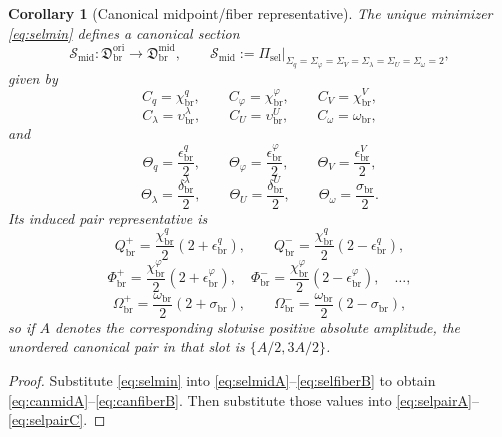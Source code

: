 \documentclass[11pt]{article}
\newcommand{\OriginSector}{\mathfrak D_{\mathrm{br}}^{\mathrm{ori}}}
\newcommand{\AbsReadAmp}{\chi_{\mathrm{br}}^{q}}
\newcommand{\AbsCovAmp}{\chi_{\mathrm{br}}^{\varphi}}
\newcommand{\AbsRelaxAmp}{\chi_{\mathrm{br}}^{V}}
\newcommand{\AbsWellAmp}{\upsilon_{\mathrm{br}}^{\lambda}}
\newcommand{\AbsEqAmp}{\upsilon_{\mathrm{br}}^{U}}
\newcommand{\AbsScaleAmp}{\omega_{\mathrm{br}}}
\newcommand{\PolRead}{\epsilon_{\mathrm{br}}^{q}}
\newcommand{\PolCov}{\epsilon_{\mathrm{br}}^{\varphi}}
\newcommand{\PolRelax}{\epsilon_{\mathrm{br}}^{V}}
\newcommand{\PolWell}{\delta_{\mathrm{br}}^{\lambda}}
\newcommand{\PolEq}{\delta_{\mathrm{br}}^{U}}
\newcommand{\PolScale}{\sigma_{\mathrm{br}}}
\newcommand{\PairReadPlus}{Q_{\mathrm{br}}^{+}}
\newcommand{\PairReadMinus}{Q_{\mathrm{br}}^{-}}
\newcommand{\PairCovPlus}{\Phi_{\mathrm{br}}^{+}}
\newcommand{\PairCovMinus}{\Phi_{\mathrm{br}}^{-}}
\newcommand{\PairScalePlus}{\Omega_{\mathrm{br}}^{+}}
\newcommand{\PairScaleMinus}{\Omega_{\mathrm{br}}^{-}}
\newcommand{\MidFiberSector}{\mathfrak D_{\mathrm{br}}^{\mathrm{mid}}}
\newcommand{\MidRead}{C_{q}}
\newcommand{\MidCov}{C_{\varphi}}
\newcommand{\MidRelax}{C_{V}}
\newcommand{\MidWell}{C_{\lambda}}
\newcommand{\MidEq}{C_{U}}
\newcommand{\MidScale}{C_{\omega}}
\newcommand{\FiberRead}{\Theta_{q}}
\newcommand{\FiberCov}{\Theta_{\varphi}}
\newcommand{\FiberRelax}{\Theta_{V}}
\newcommand{\FiberWell}{\Theta_{\lambda}}
\newcommand{\FiberEq}{\Theta_{U}}
\newcommand{\FiberScale}{\Theta_{\omega}}
\newcommand{\MidSelMap}{\Pi_{\mathrm{sel}}}
\newcommand{\SelRead}{\Sigma_{q}}
\newcommand{\SelCov}{\Sigma_{\varphi}}
\newcommand{\SelRelax}{\Sigma_{V}}
\newcommand{\SelWell}{\Sigma_{\lambda}}
\newcommand{\SelEq}{\Sigma_{U}}
\newcommand{\SelScale}{\Sigma_{\omega}}
\newcommand{\CanMidSection}{\mathscr S_{\mathrm{mid}}}
\newtheorem{corollary}{Corollary}
\begin{document}
\begin{corollary}[Canonical midpoint/fiber representative]
\label{cor:canonicalsection}
The unique minimizer \eqref{eq:selmin} defines a canonical section
\begin{equation}
\CanMidSection:\OriginSector\longrightarrow\MidFiberSector,
\qquad
\CanMidSection:=\MidSelMap\big|_{\SelRead=\SelCov=\SelRelax=\SelWell=\SelEq=\SelScale=2},
\label{eq:cansection}
\end{equation}
given by
\begin{equation}
\MidRead=\AbsReadAmp,
\qquad
\MidCov=\AbsCovAmp,
\qquad
\MidRelax=\AbsRelaxAmp,
\label{eq:canmidA}
\end{equation}
\begin{equation}
\MidWell=\AbsWellAmp,
\qquad
\MidEq=\AbsEqAmp,
\qquad
\MidScale=\AbsScaleAmp,
\label{eq:canmidB}
\end{equation}
and
\begin{equation}
\FiberRead=\frac{\PolRead}{2},
\qquad
\FiberCov=\frac{\PolCov}{2},
\qquad
\FiberRelax=\frac{\PolRelax}{2},
\label{eq:canfiberA}
\end{equation}
\begin{equation}
\FiberWell=\frac{\PolWell}{2},
\qquad
\FiberEq=\frac{\PolEq}{2},
\qquad
\FiberScale=\frac{\PolScale}{2}.
\label{eq:canfiberB}
\end{equation}
Its induced pair representative is
\begin{equation}
\PairReadPlus=\frac{\AbsReadAmp}{2}(2+\PolRead),
\qquad
\PairReadMinus=\frac{\AbsReadAmp}{2}(2-\PolRead),
\label{eq:canpairA}
\end{equation}
\begin{equation}
\PairCovPlus=\frac{\AbsCovAmp}{2}(2+\PolCov),
\quad
\PairCovMinus=\frac{\AbsCovAmp}{2}(2-\PolCov),
\quad
\ldots,
\label{eq:canpairB}
\end{equation}
\begin{equation}
\PairScalePlus=\frac{\AbsScaleAmp}{2}(2+\PolScale),
\qquad
\PairScaleMinus=\frac{\AbsScaleAmp}{2}(2-\PolScale),
\label{eq:canpairC}
\end{equation}
so if \(A\) denotes the corresponding slotwise positive absolute amplitude, the unordered canonical pair in that slot is \(\{A/2,3A/2\}\).
\end{corollary}

\begin{proof}
Substitute \eqref{eq:selmin} into \eqref{eq:selmidA}--\eqref{eq:selfiberB} to obtain \eqref{eq:canmidA}--\eqref{eq:canfiberB}. Then substitute those values into \eqref{eq:selpairA}--\eqref{eq:selpairC}.
\end{proof}
\end{document}
